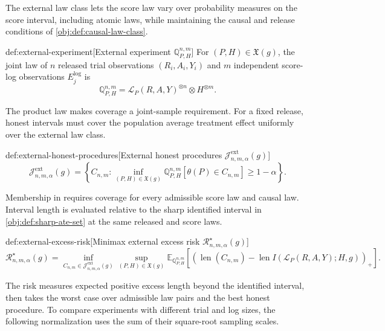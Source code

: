 The external law class  lets the score law vary over probability measures on the score interval, including atomic laws, while maintaining the causal and release conditions of \cref{obj:def:causal-law-class}.

\begin{definitionv}{def:external-experiment}[External experiment $\mathbb Q_{P,H}^{n,m}$]
For \((P,H)\in\mathfrak X(g)\), the joint law of \(n\) released trial observations \((R_i,A_i,Y_i)\) and \(m\) independent score-log observations \(E_j^{\mathrm{log}}\) is
\[
\mathbb Q_{P,H}^{n,m}
=
\mathcal L_P(R,A,Y)^{\otimes n}\otimes H^{\otimes m}.
\]
\end{definitionv}

The product law  makes coverage a joint-sample requirement. For a fixed release, honest intervals must cover the population average treatment effect uniformly over the external law class.

\begin{definitionv}{def:external-honest-procedures}[External honest procedures $\mathcal J^{\mathrm{ext}}_{n,m,\alpha}(g)$]
\[
\mathcal J^{\mathrm{ext}}_{n,m,\alpha}(g)
=
\left\{
C_{n,m}:
\inf_{(P,H)\in\mathfrak X(g)}
\mathbb Q_{P,H}^{n,m}\!\left[
\theta(P)\in C_{n,m}
\right]
\ge 1-\alpha
\right\}.
\]
\end{definitionv}

Membership in  requires coverage for every admissible score law and causal law. Interval length is evaluated relative to the sharp identified interval in \cref{obj:def:sharp-ate-set} at the same released and score laws.

\begin{definitionv}{def:external-excess-risk}[Minimax external excess risk $\mathcal R^{\star}_{n,m,\alpha}(g)$]
\[
\mathcal R^{\star}_{n,m,\alpha}(g)
=
\inf_{C_{n,m}\in\mathcal J^{\mathrm{ext}}_{n,m,\alpha}(g)}
\sup_{(P,H)\in\mathfrak X(g)}
\mathbb E_{\mathbb Q_{P,H}^{n,m}}
\!\left[
\left(
\operatorname{len}(C_{n,m})
-
\operatorname{len}I(\mathcal L_P(R,A,Y);H,g)
\right)_+
\right].
\]
\end{definitionv}

The risk  measures expected positive excess length beyond the identified interval, then takes the worst case over admissible law pairs and the best honest procedure. To compare experiments with different trial and log sizes, the following normalization uses the sum of their square-root sampling scales.

